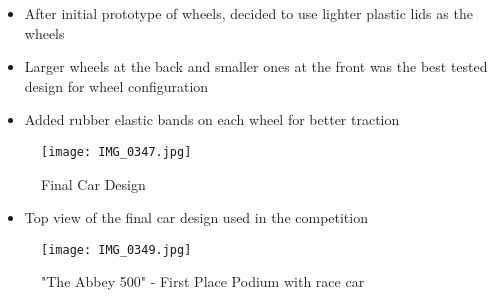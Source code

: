 \documentclass[12pt]{article}
\begin{document}
\begin{itemize}
    \item After initial prototype of wheels, decided to use lighter plastic lids as the wheels
    \item Larger wheels at the back and smaller ones at the front was the best tested design for wheel configuration
    \item Added rubber elastic bands on each wheel for better traction
    
  \end{itemize}


\begin{figure}[H]
    \centering
    \texttt{[image: IMG\_0347.jpg]}
    \caption{Final Car Design}
    \label{fig:enter-label}
\end{figure}

\begin{itemize}
    \item Top view of the final car design used in the competition
    
  \end{itemize}


\begin{figure}[H]
    \centering
    \texttt{[image: IMG\_0349.jpg]}
    \caption{"The Abbey 500" - First Place Podium with race car}
    \label{fig:enter-label}
\end{figure}
\end{document}
